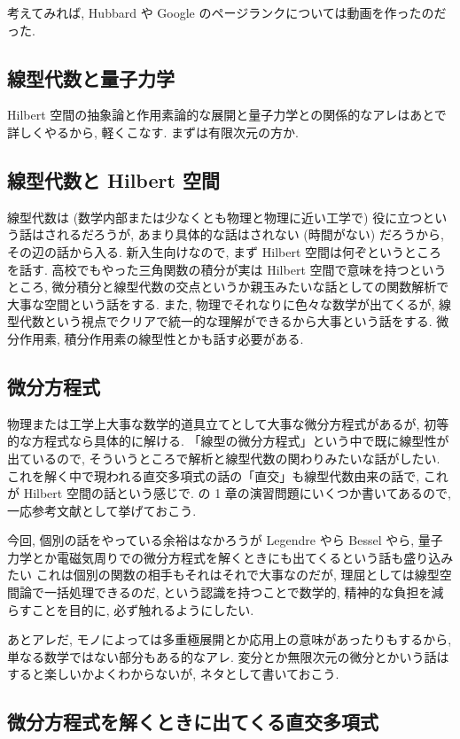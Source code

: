 \documentclass[openany, a4paper, oneside]{book}
\theoremstyle{break}
\theoremstyle{breakdefn}
\begin{document}
考えてみれば, Hubbard や Google のページランクについては動画を作ったのだった.
\subsection{線型代数と量子力学}
\label{sec-7-4-1-5}

Hilbert 空間の抽象論と作用素論的な展開と量子力学との関係的なアレはあとで詳しくやるから, 軽くこなす.
まずは有限次元の方か.
\subsection{線型代数と Hilbert 空間}
\label{sec-7-4-1-6}

線型代数は (数学内部または少なくとも物理と物理に近い工学で) 役に立つという話はされるだろうが,
あまり具体的な話はされない (時間がない) だろうから, その辺の話から入る.
新入生向けなので, まず Hilbert 空間は何ぞというところを話す.
高校でもやった三角関数の積分が実は Hilbert 空間で意味を持つというところ,
微分積分と線型代数の交点というか親玉みたいな話としての関数解析で大事な空間という話をする.
また, 物理でそれなりに色々な数学が出てくるが, 線型代数という視点でクリアで統一的な理解ができるから大事という話をする.
微分作用素, 積分作用素の線型性とかも話す必要がある.
\subsection{微分方程式}
\label{sec-7-4-1-7}

物理または工学上大事な数学的道具立てとして大事な微分方程式があるが,
初等的な方程式なら具体的に解ける.
「線型の微分方程式」という中で既に線型性が出ているので, そういうところで解析と線型代数の関わりみたいな話がしたい.
これを解く中で現われる直交多項式の話の「直交」も線型代数由来の話で, これが Hilbert 空間の話という感じで.
\cite{AraiEzawa1} の 1 章の演習問題にいくつか書いてあるので, 一応参考文献として挙げておこう.

今回, 個別の話をやっている余裕はなかろうが Legendre やら Bessel やら,
量子力学とか電磁気周りでの微分方程式を解くときにも出てくるという話も盛り込みたい
これは個別の関数の相手もそれはそれで大事なのだが, 理屈としては線型空間論で一括処理できるのだ,
という認識を持つことで数学的, 精神的な負担を減らすことを目的に, 必ず触れるようにしたい.

あとアレだ, モノによっては多重極展開とか応用上の意味があったりもするから,
単なる数学ではない部分もある的なアレ.
変分とか無限次元の微分とかいう話はすると楽しいかよくわからないが, ネタとして書いておこう.
\subsection{微分方程式を解くときに出てくる直交多項式}
\label{sec-7-4-1-8}
\end{document}
